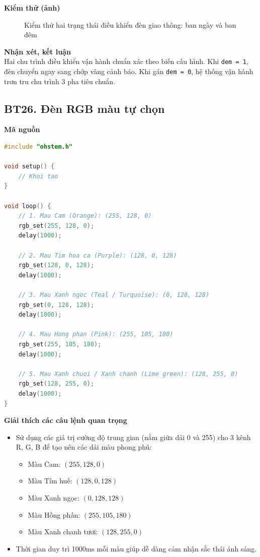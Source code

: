 \noindent\textbf{Kiểm thử (ảnh)}\\
\begin{figure}[H]
    \centering
    \caption{Kiểm thử hai trạng thái điều khiển đèn giao thông: ban ngày và ban đêm}
    \label{fig:bt25}
\end{figure}

\noindent\textbf{Nhận xét, kết luận}\\
Hai chu trình điều khiển vận hành chuẩn xác theo biến cấu hình. Khi \texttt{dem = 1}, đèn chuyển ngay sang chớp vàng cảnh báo. Khi gán \texttt{dem = 0}, hệ thống vận hành trơn tru chu trình 3 pha tiêu chuẩn.


\subsection*{BT26. Đèn RGB màu tự chọn}

\noindent\textbf{Mã nguồn}\\
\begin{lstlisting}[language=C]
#include "ohstem.h"

void setup() {
    // Khoi tao
}

void loop() {
    // 1. Mau Cam (Orange): (255, 128, 0)
    rgb_set(255, 128, 0);
    delay(1000);

    // 2. Mau Tim hoa ca (Purple): (128, 0, 128)
    rgb_set(128, 0, 128);
    delay(1000);

    // 3. Mau Xanh ngoc (Teal / Turquoise): (0, 128, 128)
    rgb_set(0, 128, 128);
    delay(1000);

    // 4. Mau Hong phan (Pink): (255, 105, 180)
    rgb_set(255, 105, 180);
    delay(1000);

    // 5. Mau Xanh chuoi / Xanh chanh (Lime green): (128, 255, 0)
    rgb_set(128, 255, 0);
    delay(1000);
}
\end{lstlisting}

\noindent\textbf{Giải thích các câu lệnh quan trọng}\\
\begin{itemize}
    \item Sử dụng các giá trị cường độ trung gian (nằm giữa dải 0 và 255) cho 3 kênh R, G, B để tạo nên các dải màu phong phú:
    \begin{itemize}
        \item Màu Cam: $(255, 128, 0)$
        \item Màu Tím huế: $(128, 0, 128)$
        \item Màu Xanh ngọc: $(0, 128, 128)$
        \item Màu Hồng phấn: $(255, 105, 180)$
        \item Màu Xanh chanh tươi: $(128, 255, 0)$
    \end{itemize}
    \item Thời gian duy trì 1000ms mỗi màu giúp dễ dàng cảm nhận sắc thái ánh sáng.
\end{itemize}

